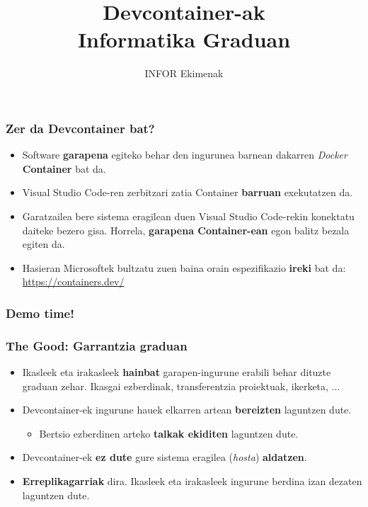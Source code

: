 \documentclass[lang=eu,biz=pls,aspectratio=169,handout]{mupresentation}
\title{Devcontainer-ak\\Informatika Graduan}
\subtitle{INFOR Ekimenak}
\institute{Mondragon Unibertsitatea}
\date{}
\begin{document}
\mucover

\begin{frame}
  \frametitle{Zer da Devcontainer bat?}
  \begin{itemize}
    \item Software \textbf{garapena} egiteko behar den ingurunea barnean dakarren \textit{Docker} \textbf{Container} bat da.
    \item Visual Studio Code-ren zerbitzari zatia Container \textbf{barruan} exekutatzen da.
    \item Garatzailea bere sistema eragilean duen Visual Studio Code-rekin konektatu daiteke bezero gisa. Horrela, \textbf{garapena Container-ean} egon balitz bezala egiten da.
    \item Hasieran Microsoftek bultzatu zuen baina orain espezifikazio \textbf{ireki} bat da:
      \url{https://containers.dev/}
  \end{itemize}
\end{frame}

\begin{frame}
  \frametitle{Demo time!}
\end{frame}

\begin{frame}
  \frametitle{The Good: Garrantzia graduan}
  \begin{itemize}
    \item Ikasleek eta irakasleek \textbf{hainbat} garapen-ingurune erabili behar dituzte graduan zehar. Ikasgai ezberdinak, transferentzia proiektuak, ikerketa, ...
    \item Devcontainer-ek ingurune hauek elkarren artean \textbf{bereizten} laguntzen dute.
    \begin{itemize}
      \item Bertsio ezberdinen arteko \textbf{talkak ekiditen} laguntzen dute.
    \end{itemize}
    \item Devcontainer-ek \textbf{ez dute} gure sistema eragilea (\textit{hosta}) \textbf{aldatzen}.
    \item \textbf{Erreplikagarriak} dira. Ikasleek eta irakasleek ingurune berdina izan dezaten laguntzen dute.
  \end{itemize}
\end{frame}
\end{document}
